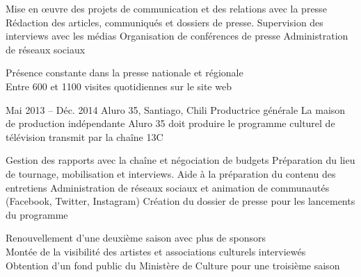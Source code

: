 \documentclass[30pt, french]{tccv}
\begin{document}
\begin{upshape}
\begin{textblock}{13.3}
\begin{mdframed}
\begin{eventlist}
    \setlength{\parskip}{-10pt}
    \begin{itemize}
      \setlength\itemsep{-3pt} 
      \cvitem[\checkmark] Mise en œuvre des projets de communication et des relations avec la presse
      \cvitem[\checkmark] Rédaction des articles, communiqués et dossiers de presse. Supervision des interviews avec les médias
      \cvitem[\checkmark] Organisation de conférences de presse
      \cvitem[\checkmark] Administration de réseaux sociaux
    \end{itemize}     
     Présence constante dans la presse nationale et régionale  \\
    \makebox[1.4cm][l]{}          Entre 600 et 1100 visites quotidiennes sur le site web 
               
\setlength{\parskip}{0pt}        
\item{Mai 2013 -- Déc. 2014}
     {Aluro 35, Santiago, Chili}
     {Productrice générale}
     \fontsize{9pt}{1em}\color{text}\bodyfontlight\upshape\selectfont
     La maison de production indépendante Aluro 35 doit produire le programme culturel de télévision  transmit par la chaîne 13C \\
    
    \setlength{\parskip}{-10pt}
    \begin{itemize}
      \setlength\itemsep{-3pt} 
      \cvitem[\checkmark] Gestion des rapports avec la chaîne et négociation de budgets                       
      \cvitem[\checkmark] Préparation du lieu de tournage, mobilisation et interviews. Aide à la préparation du contenu des entretiens 
      \cvitem[\checkmark] Administration de réseaux sociaux et animation de communautés (Facebook, Twitter, Instagram)                 
      \cvitem[\checkmark] Création du dossier de presse pour les lancements du programme                                               
    \end{itemize}     
 Renouvellement d'une deuxième saison avec plus de sponsors \\
\makebox[1.4cm][l]{}	       Montée de la visibilité des artistes et associations culturels interviewés \\
\makebox[1.4cm][l]{}           Obtention d’un fond public du Ministère de Culture pour une troisième saison  \\





\end{eventlist}
\end{mdframed}
\end{textblock}
\end{upshape}
\end{document}
